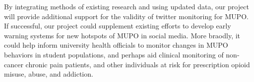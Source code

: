 \documentclass[sigconf]{acmart}
\begin{document}
By integrating methods of existing research and using updated data, our project
will provide additional support for the validity of twitter monitoring for MUPO. 
If successful, our project could supplement existing efforts to
develop early warning systems for new hotspots of MUPO in social media. More
braodly, it could help inform university health officials to monitor changes in 
MUPO behaviors in student populations, and perhaps aid clinical monitoring of 
non-cancer chronic pain patients, and other individuals at risk for prescription 
opioid misuse, abuse, and addiction. 
 






 

%
\end{document}
